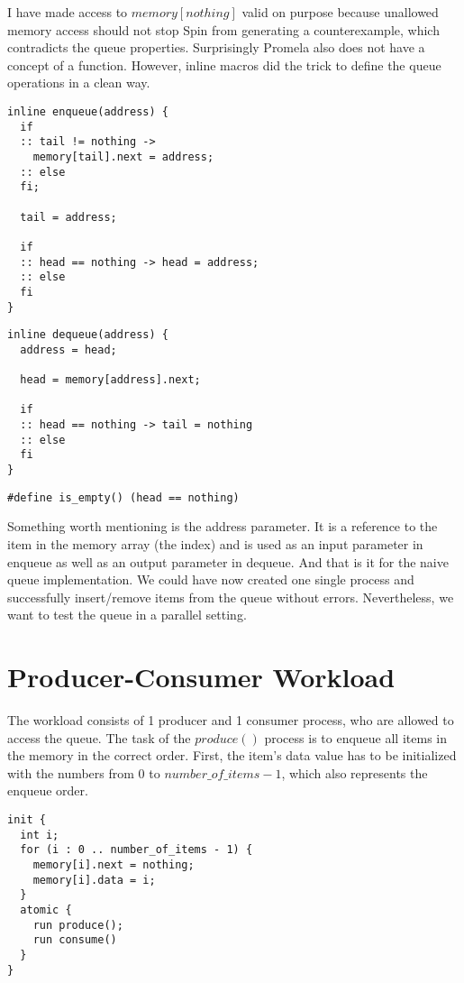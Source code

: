 \documentclass{article}
\begin{document}
I have made access to $memory[nothing]$ valid on purpose because unallowed memory access should not stop Spin from generating a counterexample, which contradicts the queue properties.
Surprisingly Promela also does not have a concept of a function.
However, inline macros did the trick to define the queue operations in a clean way.

\begin{lstlisting}[language=Promela]
inline enqueue(address) {
  if 
  :: tail != nothing -> 
    memory[tail].next = address; 
  :: else
  fi;

  tail = address;

  if 
  :: head == nothing -> head = address;
  :: else
  fi
}
\end{lstlisting}

\begin{lstlisting}[language=Promela]
inline dequeue(address) {
  address = head;

  head = memory[address].next;

  if 
  :: head == nothing -> tail = nothing
  :: else
  fi
}
\end{lstlisting}

\begin{lstlisting}[language=Promela]
#define is_empty() (head == nothing)
\end{lstlisting}

Something worth mentioning is the address parameter. It is a reference to the item in the memory array (the index) and is used as an input parameter in enqueue as well as an output parameter in dequeue.
And that is it for the naive queue implementation. We could have now created one single process and successfully insert/remove items from the queue without errors. Nevertheless, we want to test the queue in a parallel setting.

\section{Producer-Consumer Workload}

The workload consists of 1 producer and 1 consumer process, who are allowed to access the queue.
The task of the $produce()$ process is to enqueue all items in the memory in the correct order. 
First, the item's data value has to be initialized with the numbers from 0 to $number\_of\_items - 1$, which also represents the enqueue order.

\begin{lstlisting}[language=Promela]
init {
  int i;
  for (i : 0 .. number_of_items - 1) {
    memory[i].next = nothing;
    memory[i].data = i;
  }
  atomic {
    run produce();
    run consume()
  }
}
\end{lstlisting}
\end{document}
